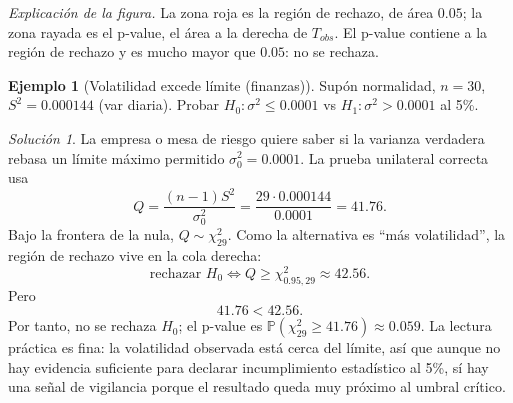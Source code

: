 \documentclass[11pt]{article}
\theoremstyle{plain}
\theoremstyle{definition}
\newtheorem{example}[theorem]{Ejemplo}
\theoremstyle{remark}
\theoremstyle{solstyle}
\newtheorem*{solution}{Solución}
\newcommand{\Pbb}{\mathbb{P}}
\newcommand{\1}{\mathbbm{1}}
\begin{document}
\begin{center}
\end{center}

\noindent\textit{Explicación de la figura.} La zona roja es la región de rechazo, de área $0.05$; la zona rayada es el p-value, el área a la derecha de $T_{obs}$. El p-value contiene a la región de rechazo y es mucho mayor que $0.05$: no se rechaza.


\begin{example}[Volatilidad excede límite (finanzas)]
Supón normalidad, $n=30$, $S^2=0.000144$ (var diaria). Probar $H_0:\sigma^2\le 0.0001$ vs $H_1:\sigma^2>0.0001$ al 5\%.
\end{example}

\begin{solution}
La empresa o mesa de riesgo quiere saber si la varianza verdadera rebasa un límite máximo permitido $\sigma_0^2=0.0001$. La prueba unilateral correcta usa
\[
Q=\frac{(n-1)S^2}{\sigma_0^2}
=\frac{29\cdot 0.000144}{0.0001}
=41.76.
\]
Bajo la frontera de la nula, $Q\sim \chi^2_{29}$. Como la alternativa es ``más volatilidad'', la región de rechazo vive en la cola derecha:
\[
\text{rechazar }H_0 \iff Q\ge \chi^2_{0.95,29}\approx 42.56.
\]
Pero
\[
41.76<42.56.
\]
Por tanto, no se rechaza $H_0$; el p-value es $\Pbb(\chi^2_{29}\ge 41.76)\approx 0.059$. La lectura práctica es fina: la volatilidad observada está cerca del límite, así que aunque no hay evidencia suficiente para declarar incumplimiento estadístico al 5\%, sí hay una señal de vigilancia porque el resultado queda muy próximo al umbral crítico.
\end{solution}
\end{document}
